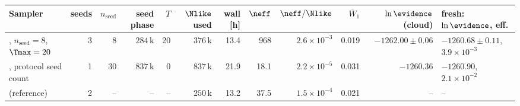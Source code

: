 \begin{tabular}{@{}lrrrrrrrrrrl@{}}
  \toprule
  Sampler & seeds & \(n_{\mathrm{seed}}\) & seed phase & \(T\) & \(\Nlike\) used & wall [h] & \(\neff\) & \(\neff/\Nlike\) & \(\overline{W}_1\) & \(\ln\evidence\) (cloud) & fresh: \(\ln\evidence\), eff. \\
  \midrule
  \mw{}, \(n_{\mathrm{seed}} = 8\), \(\Tmax = 20\) & 3 & 8 & \(284\,\mathrm{k}\) & 20 & \(376\,\mathrm{k}\) & 13.4 & 968 & \(2.6 \times 10^{-3}\) & 0.019 & \(-1262.00 \pm 0.06\) & \(-1260.68 \pm 0.11\), \(3.9 \times 10^{-3}\) \\
  \mw{}, protocol seed count & 1 & 30 & \(837\,\mathrm{k}\) & 0 & \(837\,\mathrm{k}\) & 21.9 & 18.1 & \(2.2 \times 10^{-5}\) & 0.031 & \(-1260.36\) & \(-1260.90\), \(2.1 \times 10^{-2}\) \\
  \mh{} (reference) & 2 & -- & -- & -- & \(250\,\mathrm{k}\) & 13.2 & 37.5 & \(1.5 \times 10^{-4}\) & 0.021 & -- & -- \\
  \bottomrule
\end{tabular}
